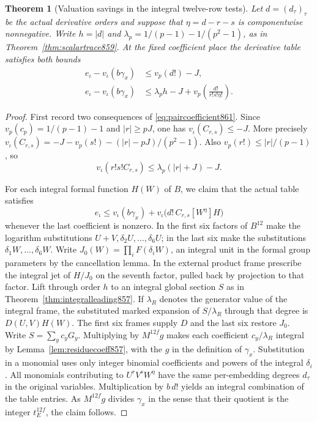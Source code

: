 \documentclass[a4paper,11pt]{article}
\newtheorem{theorem}[proposition]{Theorem}
\theoremstyle{definition}
\theoremstyle{remark}
\numberwithin{equation}{section}
\begin{document}
\begin{theorem}[Valuation savings in the integral twelve-row tests]
\leavevmode\label{thm:pairedtable861}
Let \(d=(d_\tau)_\tau\) be the actual derivative orders and
suppose that \(\eta=d-r-s\) is componentwise nonnegative.
Write \(h=|d|\) and
\(\lambda_p=1/(p-1)-1/(p^2-1)\), as in
Theorem~\ref{thm:scalartrace859}. At the fixed coefficient place
the derivative table satisfies both bounds
\begin{align}
 e_\iota-v_\iota(b\gamma_x)&\le v_p(d!)-J,
                 \label{eq:firstpair861}\\
 e_\iota-v_\iota(b\gamma_x)&\le
        \lambda_p h-J+v_p\!\left(\frac{d!}{r!s!\eta!}\right).
                 \label{eq:secondpair861}
\end{align}
\end{theorem}
\begin{proof}
First record two consequences of \eqref{eq:paircoefficient861}.
Since \(v_p(c_p)=1/(p-1)-1\) and \(|r|\ge pJ\),
one has \(v_\iota(C_{r,s})\le-J\). More precisely
\(v_\iota(C_{r,s})=-J-v_p(s!)-(|r|-pJ)/(p^2-1)\).
Also \(v_p(r!)\le |r|/(p-1)\), so
\[
           v_\iota(r!s! C_{r,s})\le
                             \lambda_p(|r|+J)-J.
\]

For each integral formal function \(H(W)\) of \(B\), we
claim that the actual table satisfies
\[
 e_\iota\le v_\iota(b\gamma_x)+
           v_\iota\bigl(d!\,C_{r,s}[W^\eta]H\bigr)
\]
whenever the last coefficient is nonzero. In the first six
factors of \(B^{12}\) make the logarithm substitutions
\(U+V,\delta_2 U,\ldots,\delta_6 U\); in the last six
make the substitutions \(\delta_1W,\ldots,\delta_6W\).
Write \(J_0(W)=\prod_iF(\delta_i W)\), an integral unit in
the formal group parameters by the cancellation lemma.
In the external product frame prescribe the integral jet of
\(H/J_0\) on the seventh factor, pulled back by projection
to that factor. Lift through order \(h\) to an integral
global section \(S\) as in Theorem~\ref{thm:integralleading857}.
If \(\lambda_R\) denotes the generator value of the integral
frame, the substituted marked expansion of \(S/\lambda_R\)
through that degree is \(D(U,V)H(W)\). The first six frames
supply \(D\) and the last six restore \(J_0\).
Write \(S=\sum_y c_yG_y\). Multiplying by \(M^{12f}g\) makes
each coefficient \(c_y/\lambda_R\) integral by
Lemma~\ref{lem:residuecoeff857}, with the \(g\) in the definition
of \(\gamma_x\). Substitution in a monomial uses only integer
binomial coefficients and powers of the integral \(\delta_i\).
All monomials contributing to \(U^rV^sW^\eta\) have the same
per-embedding degrees \(d_\tau\) in the original variables.
Multiplication by \(b\,d!\) yields an integral combination
of the table entries. As \(M^{12f}g\) divides \(\gamma_x\)
in the sense that their quotient is the integer \(t_E^{12f}\),
the claim follows.


\end{proof}
\end{document}
